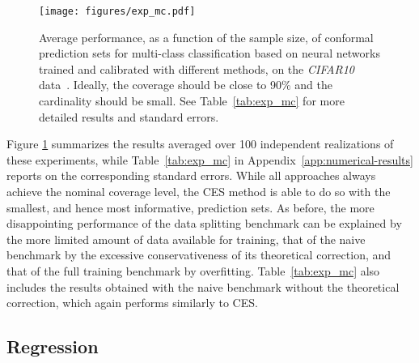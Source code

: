 \begin{figure}[!htb]
    \centering
    \texttt{[image: figures/exp\_mc.pdf]}\vspace{-0.5cm}
    \caption{Average performance, as a function of the sample size, of conformal prediction sets for multi-class classification based on neural networks trained and calibrated with different methods, on the {\em CIFAR10} data~\citep{cifar10}. Ideally, the coverage should be close to 90\% and the cardinality should be small. See Table~\ref{tab:exp_mc} for more detailed results and standard errors.}
    \label{fig:exp_mc}
\end{figure}

Figure \ref{fig:exp_mc} summarizes the results averaged over 100 independent realizations of these experiments, while Table~\ref{tab:exp_mc} in Appendix~\ref{app:numerical-results} reports on the corresponding standard errors. 
While all approaches always achieve the nominal coverage level, the CES method is able to do so with the smallest, and hence most informative, prediction sets.
As before, the more disappointing performance of the data splitting benchmark can be explained by the more limited amount of data available for training, that of the naive benchmark by the excessive conservativeness of its theoretical correction, and that of the full training benchmark by overfitting.
Table~\ref{tab:exp_mc} also includes the results obtained with the naive benchmark without the theoretical correction, which again performs similarly to CES.


\subsection{Regression}

